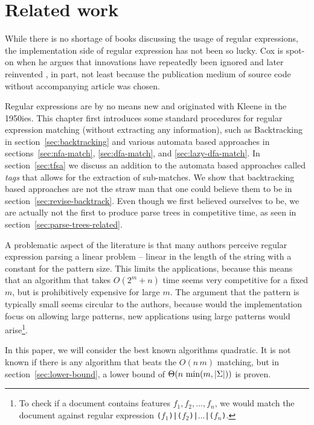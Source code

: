 \documentclass[11pt,a4paper,twoside,openright]{Thesis}
\theoremstyle{definition}
\newcommand{\Secref}[1]{section~\ref{sec:#1}}
\newcommand{\seclabel}[1]{\label{sec:#1}}
\begin{document}
\chapter{Related work}
\seclabel{related}
While there is no shortage of books discussing the usage of regular
expressions, the implementation side of regular expression has not
been so lucky. Cox is spot-on when he argues that innovations have
repeatedly been ignored and later reinvented \cite{Cox07a,Cox09a,Cox10a}, in 
part, not least because the publication medium of source code without
accompanying article was chosen.

Regular expressions are by no means new and originated with Kleene in the
1950ies\cite{Sips05a}. This chapter first introduces some standard
procedures for regular expression matching (without extracting any
information), such as Backtracking in \Secref{backtracking} and various
automata based approaches in sections~\ref{sec:nfa-match}, \ref{sec:dfa-match},
and \ref{sec:lazy-dfa-match}. In \Secref{tfsa} we discuss an addition to
the automata based approaches called \emph{tags} that allows for the extraction
of sub-matches. We show that backtracking based approaches are not the
straw man that one could believe them to be in \Secref{revise-backtrack}.
Even though we first believed ourselves to be, we are actually not the first
to produce parse trees in competitive time, as seen in \Secref{parse-trees-related}.

A problematic aspect of the literature is that many authors perceive regular 
expression parsing a linear problem -- linear in the length of the string 
with a constant for the pattern size. This limits the applications, because 
this means that an algorithm that takes $O(2^m+n)$ time seems very 
competitive for a fixed $m$, but is prohibitively expensive for large $m$. 
The argument that the pattern is typically small seems circular to the 
authors, because would the implementation focus on allowing large patterns, 
new applications using large patterns would arise\footnote{To check if a document
contains features $f_1, f_2, \dots, f_n$, we would match the document
against regular expression \texttt{($f_1$)|($f_2$)|$\dots$|($f_n$)}.}.

In this paper, we will consider the best known algorithms quadratic. It is 
not known if there is any algorithm that beats the $O(n\, m)$ matching, but 
in \Secref{lower-bound}, a lower bound of $\Theta(n\, \min(m, \left|\Sigma\right|))$ 
is proven.
\end{document}
